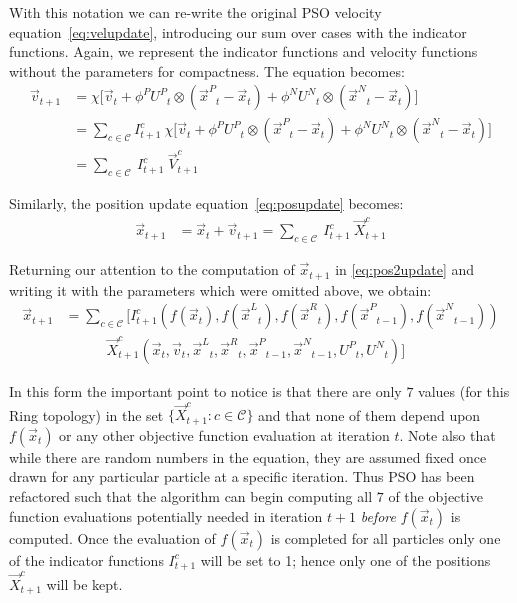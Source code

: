 \documentclass{llncs}
\newcommand{\parens}[1]{\!\left(#1\right)}
\providecommand{\pers}{\ensuremath{P}}
\providecommand{\neigh}{\ensuremath{N}}
\providecommand{\leftind}{\ensuremath{L}}
\providecommand{\rightind}{\ensuremath{R}}
\providecommand{\nURand}{\ensuremath{U^\neigh}}
\providecommand{\pURand}{\ensuremath{U^\pers}}
\providecommand{\ppos}{\ensuremath{\Vec{x}}}
\providecommand{\pvel}{\ensuremath{\Vec{v}}}
\providecommand{\nbest}{\ensuremath{\Vec{x}^\neigh}}
\providecommand{\pbest}{\ensuremath{\Vec{x}^\pers}}
\providecommand{\constriction}{\ensuremath{\chi}}
\providecommand{\ncoeff}{\ensuremath{\phi^\neigh}}
\providecommand{\pcoeff}{\ensuremath{\phi^\pers}}
\providecommand{\ofunc}{\ensuremath{f}}
\providecommand{\indic}{\ensuremath{I}}
\providecommand{\specvel}{\ensuremath{\vec{V}}}
\providecommand{\specpos}{\ensuremath{\vec{X}}}
\providecommand{\leftn}{\ensuremath{\Vec{x}^\leftind}}
\providecommand{\rightn}{\ensuremath{\Vec{x}^\rightind}}
\providecommand{\caseset}{\ensuremath{\mathcal{C}}}
\providecommand{\casegen}{\ensuremath{c}}
\begin{document}
With this notation we can re-write the original PSO velocity
equation~\eqref{eq:velupdate}, introducing our sum over cases with the
indicator functions.  Again, we represent the indicator functions and velocity
functions without the parameters for compactness.  The equation becomes:
\begin{align}
\nonumber
	\pvel_{t+1} &=
		\constriction \bigl[ \pvel_t
			+ \pcoeff\pURand_{t}\otimes\parens{\pbest_{t} - \ppos_{t}}
			+ \ncoeff\nURand_{t}\otimes\parens{\nbest_{t} -
			\ppos_{t}} \bigr] \\
\nonumber
	&= \sum_{c \in \caseset} \indic_{t+1}^{c} \ \constriction \bigl[ \pvel_t
			+ \pcoeff\pURand_{t}\otimes\parens{\pbest_{t} - \ppos_{t}}
			+ \ncoeff\nURand_{t}\otimes\parens{\nbest_{t} -
			\ppos_{t}} \bigr]  \\
\label{eq:vel2update}
	&= \sum_{c \in \caseset} \ \indic_{t+1}^{c} \ \specvel_{t+1}^{c} 
\end{align}

Similarly, the position update equation~\eqref{eq:posupdate} becomes:
\begin{align}
\label{eq:pos2update}
	\ppos_{t+1} &= \ppos_{t} + \pvel_{t+1}
	= \sum_{c \in \caseset} \ \indic_{t+1}^{c} \ \specpos_{t+1}^{c} 
\end{align}

Returning our attention to the computation of $\ppos_{t+1}$ in
\eqref{eq:pos2update} and writing it with the parameters which were omitted
above, we obtain:
\begin{align}
\nonumber
  \ppos_{t+1} &= \sum_{c \in \caseset} \bigl[
	\indic_{t+1}^{c}\parens{
	  \ofunc\parens{\ppos_{t}},
	  \ofunc\parens{\leftn_{t}},
	  \ofunc\parens{\rightn_{t}},
	  \ofunc\parens{\pbest_{t-1}},
	  \ofunc\parens{\nbest_{t-1}}
	  } \\
\label{eq:val2updatelong}
	& \quad \quad \quad \specpos_{t+1}^{c}\parens{
	  \ppos_{t},
	  \pvel_{t},
	  \leftn_{t},
	  \rightn_{t},
	  \pbest_{t-1},
	  \nbest_{t-1},
	  \pURand_{t},
	  \nURand_{t}
	  }\bigr]
\end{align}

In this form the important point to notice is that there are only $7$ values
(for this Ring topology) in the set $\{\specpos_{t+1}^{\casegen}: \casegen \in
\caseset\}$ and that none of them depend upon $f(\ppos_t)$ or any other
objective function evaluation at iteration $t$. Note also that while there are
random numbers in the equation, they are assumed fixed once drawn for any
particular particle at a specific iteration.  Thus PSO has been refactored such
that the algorithm can begin computing all $7$ of the objective function
evaluations potentially needed in iteration $t+1$ \emph{before} $f(\ppos_t)$ is
computed.  Once the evaluation of $f(\ppos_{t})$ is completed for all particles
only one of the indicator functions $\indic_{t+1}^{\casegen}$ will be set to 1;
hence only one of the positions $\specpos_{t+1}^\casegen$ will be kept.
\end{document}
